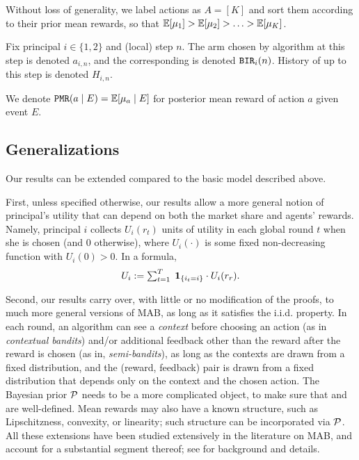  Without loss of generality, we label actions as $A=[K]$ and sort them according to their prior mean rewards, so that
    $ \E[\mu_1] > \E[\mu_2] > \ldots > \E[\mu_K]$.

Fix principal $i\in \{1,2\}$ and (local) step $n$. The arm chosen by algorithm \alg[i] at this step is denoted $a_{i,n}$, and the corresponding \BIR is denoted $\mathtt{BIR}_i(n)$. History of \alg[i] up to this step is denoted $H_{i,n}$.

We denote
    $\PMR(a\mid E) = \E[\mu_a \mid E]$
for posterior mean reward of action $a$ given event $E$.


\subsection{Generalizations}
\label{sec:model-extensions}

Our results can be extended compared to the basic model described above.


First, unless specified otherwise, our results allow a more general notion of principal's utility that can depend on both the market share and agents' rewards. Namely, principal $i$ collects $U_i(r_t)$ units of utility in each global round $t$ when she is chosen (and $0$ otherwise), where $U_i(\cdot)$ is some fixed non-decreasing function with $U_i(0)>0$. In a formula,
\begin{align}\label{eq:general-utility}
\textstyle U_i := \sum_{t=1}^T\; {\bf 1}_{\{i_t=i\}}\cdot U_i(r_r).
\end{align}

Second, our results carry over, with little or no modification of the proofs, to much more general versions of MAB, as long as it satisfies the i.i.d. property. In each round, an algorithm can see a \emph{context} before choosing an action (as in \emph{contextual bandits}) and/or additional feedback other than the reward after the reward is chosen (as in, \eg \emph{semi-bandits}), as long as the contexts are drawn from a fixed distribution, and the (reward, feedback) pair is drawn from a fixed distribution that depends only on the context and the chosen action. The Bayesian prior $\mathcal{P}$ needs to be a more complicated object, to make sure that \PMR and \BIR are well-defined. Mean rewards may also have a known structure, such as Lipschitzness, convexity, or linearity; such structure can be incorporated via $\mathcal{P}$. All these extensions have been studied extensively in the literature on MAB, and account for a substantial segment thereof; see \cite{Bubeck-survey12} for background and details.

